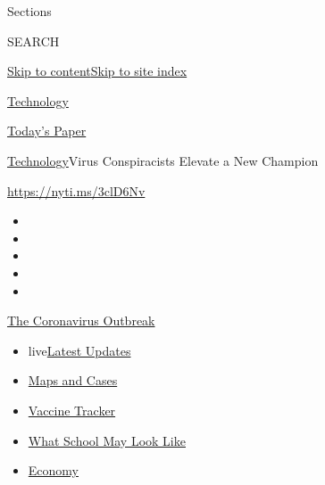 Sections

SEARCH

\protect\hyperlink{site-content}{Skip to
content}\protect\hyperlink{site-index}{Skip to site index}

\href{https://www.nytimes.com/section/technology}{Technology}

\href{https://myaccount.nytimes.com/auth/login?response_type=cookie\&client_id=vi}{}

\href{https://www.nytimes.com/section/todayspaper}{Today's Paper}

\href{/section/technology}{Technology}\textbar{}Virus Conspiracists
Elevate a New Champion

\url{https://nyti.ms/3clD6Nv}

\begin{itemize}
\item
\item
\item
\item
\item
\end{itemize}

\href{https://www.nytimes.com/news-event/coronavirus?action=click\&pgtype=Article\&state=default\&region=TOP_BANNER\&context=storylines_menu}{The
Coronavirus Outbreak}

\begin{itemize}
\tightlist
\item
  live\href{https://www.nytimes.com/2020/08/01/world/coronavirus-covid-19.html?action=click\&pgtype=Article\&state=default\&region=TOP_BANNER\&context=storylines_menu}{Latest
  Updates}
\item
  \href{https://www.nytimes.com/interactive/2020/us/coronavirus-us-cases.html?action=click\&pgtype=Article\&state=default\&region=TOP_BANNER\&context=storylines_menu}{Maps
  and Cases}
\item
  \href{https://www.nytimes.com/interactive/2020/science/coronavirus-vaccine-tracker.html?action=click\&pgtype=Article\&state=default\&region=TOP_BANNER\&context=storylines_menu}{Vaccine
  Tracker}
\item
  \href{https://www.nytimes.com/interactive/2020/07/29/us/schools-reopening-coronavirus.html?action=click\&pgtype=Article\&state=default\&region=TOP_BANNER\&context=storylines_menu}{What
  School May Look Like}
\item
  \href{https://www.nytimes.com/live/2020/07/31/business/stock-market-today-coronavirus?action=click\&pgtype=Article\&state=default\&region=TOP_BANNER\&context=storylines_menu}{Economy}
\end{itemize}

